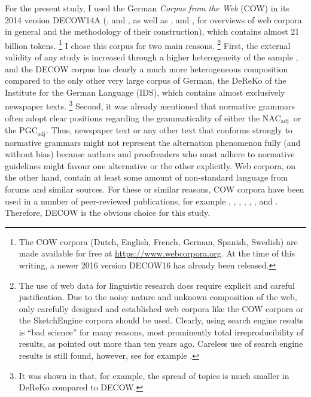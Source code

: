 \documentclass[USenglish]{article}
\newcommand{\Sub}[1]{\ensuremath{\mathrm{_{#1}}}}
\newcommand{\NACa}{NAC\Sub{adj}}
\newcommand{\PGCa}{PGC\Sub{adj}}
\begin{document}
For the present study, I used the German \textit{Corpus from the Web} (COW) in its 2014 version DECOW14A (\citealp{SchaeferBildhauer2012full}, and \citealp{Schaefer2015b}, as well as \citealp{BiemannEa2013}, and \citealp{SchaeferBildhauer2013}, for overviews of web corpora in general and the methodology of their construction), which contains almost 21 billion tokens.%
\footnote{The COW corpora (Dutch, English, French, German, Spanish, Swedish) are made available for free at \url{https://www.webcorpora.org}.
At the time of this writing, a newer 2016 version DECOW16 has already been released.}
I chose this corpus for two main reasons.%
\footnote{The use of web data for linguistic research does require explicit and careful justification.
Due to the noisy nature and unknown composition of the web, only carefully designed and established web corpora like the COW corpora or the SketchEngine corpora \citep{KilgarriffEa2014} should be used.
Clearly, using search engine results is ``bad science'' for many reasons, most prominently total irreproducibility of results, as \cite{Kilgarriff2006} pointed out more than ten years ago.
Careless use of search engine results is still found, however, see for example \citet[171--175]{DeclerckBrems2016}.}
First, the external validity of any study is increased through a higher heterogeneity of the sample \citep[30]{MaxwellDelaney2004}, and the DECOW corpus has clearly a much more heterogeneous composition compared to the only other very large corpus of German, the DeReKo \citep{KupietzEa2010} of the Institute for the German Language (IDS), which contains almost exclusively newspaper texts.%
\footnote{It was shown in \cite{W16-2601} that, for example, the spread of topics is much smaller in DeReKo compared to DECOW.}
Second, it was already mentioned that normative grammars often adopt clear positions regarding the grammaticality of either the \NACa\ or the \PGCa.
Thus, newspaper text or any other text that conforms strongly to normative grammars might not represent the alternation phenomenon fully (and without bias) because authors and proofreaders who must adhere to normative guidelines might favour one alternative or the other explicitly.
Web corpora, on the other hand, contain at least some amount of non-standard language from forums and similar sources.
For these or similar reasons, COW corpora have been used in a number of peer-reviewed publications, for example \cite{VanGoethemHiligsmann2014}, \cite{VanGoethemHuening2015}, \cite{MuellerS2014}, \cite{Schaefer2016c}, \cite{SchaeferSayatz2014}, \cite{SchaeferSayatz2016}, and \cite{Zimmer2015}. 
Therefore, DECOW is the obvious choice for this study.
\end{document}
